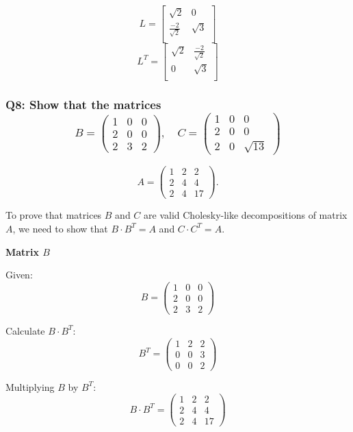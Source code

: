 \documentclass[8pt]{article}
\begin{document}
\[
   L=
  \left[ {\begin{array}{cc}
   \sqrt{2} & 0 \\
    \frac{-2}{\sqrt{2}} & \sqrt{3} \\
  \end{array} } \right]
\]
\[
   L^T=
  \left[ {\begin{array}{cc}
   \sqrt{2} & \frac{-2}{\sqrt{2}} \\
    0 & \sqrt{3} \\
  \end{array} } \right]
\]

\subsubsection*{Q8: Show that the matrices
\[ B = \begin{pmatrix} 1 & 0 & 0 \\ 2 & 0 & 0 \\ 2 & 3 & 2 \end{pmatrix}, \quad C = \begin{pmatrix} 1 & 0 & 0 \\ 2 & 0 & 0 \\ 2 & 0 & \sqrt{13} \end{pmatrix} \]
}
\[ A = \begin{pmatrix} 1 & 2 & 2 \\ 2 & 4 & 4 \\ 2 & 4 & 17 \end{pmatrix}. \]

To prove that matrices \(B\) and \(C\) are valid Cholesky-like decompositions of matrix \(A\), we need to show that \(B \cdot B^T = A\) and \(C \cdot C^T = A\). 

\textbf{Matrix \(B\)}

Given:
\[ B = \begin{pmatrix} 1 & 0 & 0 \\ 2 & 0 & 0 \\ 2 & 3 & 2 \end{pmatrix} \]

Calculate \(B \cdot B^T\):
\[ B^T = \begin{pmatrix} 1 & 2 & 2 \\ 0 & 0 & 3 \\ 0 & 0 & 2 \end{pmatrix} \]

Multiplying \(B\) by \(B^T\):
\[ B \cdot B^T = \begin{pmatrix} 1 & 2 & 2 \\ 2 & 4 & 4 \\ 2 & 4 & 17 \end{pmatrix} \]
\end{document}
